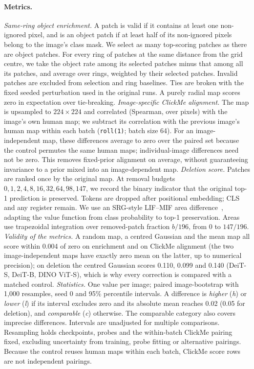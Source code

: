 \paragraph{Metrics.} \emph{Same-ring object enrichment.} A patch is valid if it contains at least one non-ignored pixel, and is an object patch if at least half of its non-ignored pixels belong to the image's class mask. We select as many top-scoring patches as there are object patches. For every ring of patches at the same distance from the grid centre, we take the object rate among its selected patches minus that among all its patches, and average over rings, weighted by their selected patches. Invalid patches are excluded from selection and ring baselines. Ties are broken with the fixed seeded perturbation used in the original runs. A purely radial map scores zero in expectation over tie-breaking.
\emph{Image-specific ClickMe alignment.} The map is upsampled to $224{\times}224$ and correlated (Spearman, over pixels) with the image's own human map; we subtract its correlation with the previous image's human map within each batch (\texttt{roll(1)}; batch size 64). For an image-independent map, these differences average to zero over the paired set because the control permutes the same human maps; individual-image differences need not be zero. This removes fixed-prior alignment on average, without guaranteeing invariance to a prior mixed into an image-dependent map.
\emph{Deletion score.} Patches are ranked once by the original map. At removal budgets $0,1,2,4,8,16,32,64,98,147$, we record the binary indicator that the original top-1 prediction is preserved. Tokens are dropped after positional embedding; CLS and any register remain. We use an SRG-style LIF--MIF area difference~\citep{bluecher2024}, adapting the value function from class probability to top-1 preservation. Areas use trapezoidal integration over removed-patch fraction $b/196$, from 0 to $147/196$.
\emph{Validity of the metrics.} A random map, a centred Gaussian and the mean map all score within 0.004 of zero on enrichment and on ClickMe alignment (the two image-independent maps have exactly zero mean on the latter, up to numerical precision); on deletion the centred Gaussian scores 0.110, 0.099 and 0.140 (DeiT-S, DeiT-B, DINO ViT-S), which is why every correction is compared with a matched control.
\emph{Statistics.} One value per image; paired image-bootstrap with 1,000 resamples, seed 0 and 95\% percentile intervals. A difference is \emph{higher} (\textit{h}) or \emph{lower} (\textit{l}) if its interval excludes zero and its absolute mean reaches 0.02 (0.05 for deletion), and \emph{comparable} (\textit{c}) otherwise. The comparable category also covers imprecise differences. Intervals are unadjusted for multiple comparisons. Resampling holds checkpoints, probes and the within-batch ClickMe pairing fixed, excluding uncertainty from training, probe fitting or alternative pairings. Because the control reuses human maps within each batch, ClickMe score rows are not independent pairings.


